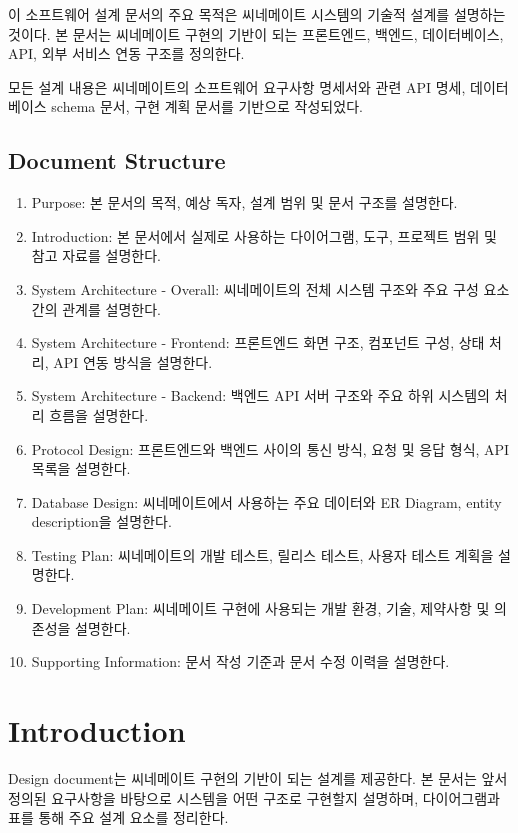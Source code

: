 \documentclass[11pt,a4paper]{article}
\providecommand{\tightlist}{%
  \setlength{\itemsep}{0.25em}\setlength{\parskip}{0.1em}}
\begin{document}
이 소프트웨어 설계 문서의 주요 목적은 씨네메이트 시스템의 기술적 설계를 설명하는 것이다. 본 문서는 씨네메이트 구현의 기반이 되는 프론트엔드, 백엔드, 데이터베이스, API, 외부 서비스 연동 구조를 정의한다.

모든 설계 내용은 씨네메이트의 소프트웨어 요구사항 명세서와 관련 API 명세, 데이터베이스 schema 문서, 구현 계획 문서를 기반으로 작성되었다.

\hypertarget{document-structure}{%
\subsection{Document Structure}\label{document-structure}}

\begin{enumerate}
\def\labelenumi{\arabic{enumi})}
\tightlist
\item
  Purpose: 본 문서의 목적, 예상 독자, 설계 범위 및 문서 구조를 설명한다.
\item
  Introduction: 본 문서에서 실제로 사용하는 다이어그램, 도구, 프로젝트 범위 및 참고 자료를 설명한다.
\item
  System Architecture - Overall: 씨네메이트의 전체 시스템 구조와 주요 구성 요소 간의 관계를 설명한다.
\item
  System Architecture - Frontend: 프론트엔드 화면 구조, 컴포넌트 구성, 상태 처리, API 연동 방식을 설명한다.
\item
  System Architecture - Backend: 백엔드 API 서버 구조와 주요 하위 시스템의 처리 흐름을 설명한다.
\item
  Protocol Design: 프론트엔드와 백엔드 사이의 통신 방식, 요청 및 응답 형식, API 목록을 설명한다.
\item
  Database Design: 씨네메이트에서 사용하는 주요 데이터와 ER Diagram, entity description을 설명한다.
\item
  Testing Plan: 씨네메이트의 개발 테스트, 릴리스 테스트, 사용자 테스트 계획을 설명한다.
\item
  Development Plan: 씨네메이트 구현에 사용되는 개발 환경, 기술, 제약사항 및 의존성을 설명한다.
\item
  Supporting Information: 문서 작성 기준과 문서 수정 이력을 설명한다.
\end{enumerate}

\hypertarget{introduction}{%
\section{Introduction}\label{introduction}}

Design document는 씨네메이트 구현의 기반이 되는 설계를 제공한다. 본 문서는 앞서 정의된 요구사항을 바탕으로 시스템을 어떤 구조로 구현할지 설명하며, 다이어그램과 표를 통해 주요 설계 요소를 정리한다.
\end{document}
